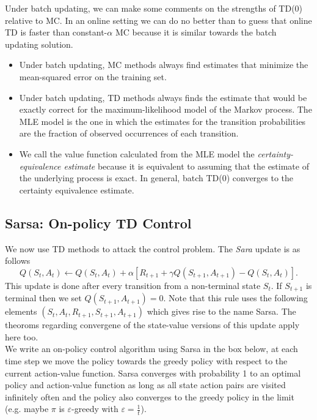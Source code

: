 Under batch updating, we can make some comments on the strengths of TD(0) relative to MC. In an online setting we can do no better than to guess that online TD is faster than constant-$\alpha$ MC because it is similar towards the batch updating solution.

\begin{itemize}
    \item Under batch updating, MC methods always find estimates that minimize the mean-squared error on the training set.
    \item Under batch updating, TD methods always finds the estimate that would be exactly correct for the maximum-likelihood model of the Markov process. The MLE model is the one in which the estimates for the transition probabilities are the fraction of observed occurrences of each transition.
    \item We call the value function calculated from the MLE model the \emph{certainty-equivalence estimate} because it is equivalent to assuming that the estimate of the underlying process is exact. In general, batch TD(0) converges to the certainty equivalence estimate.
\end{itemize}
    
\subsection{Sarsa: On-policy TD Control}
We now use TD methods to attack the control problem.  The \emph{Sara} update is as follows
\begin{equation}
    Q(S_t, A_t) \leftarrow Q(S_t, A_t) + \alpha[R_{t+1} + \gamma Q(S_{t+1}, A_{t+1}) - Q(S_t, A_t)].
\end{equation}
This update is done after every transition from a non-terminal state $S_t$. If $S_{t+1}$ is terminal then we set $Q(S_{t+1}, A_{t+1}) = 0$. Note that this rule uses the following elements $(S_t, A_t, R_{t+1}, S_{t+1}, A_{t+1})$ which gives rise to the name Sarsa. The theoroms regarding convergene of the state-value versions of this update apply here too. \\

We write an on-policy control algorithm using Sarsa in the box below, at each time step we move the policy towards the greedy policy with respect to the current action-value function. Sarsa converges with probability 1 to an optimal policy and action-value function as long as all state action pairs are visited infinitely often and the policy also converges to the greedy policy in the limit (e.g. maybe $\pi$ is $\varepsilon$-greedy with $\varepsilon=\frac1t$).

